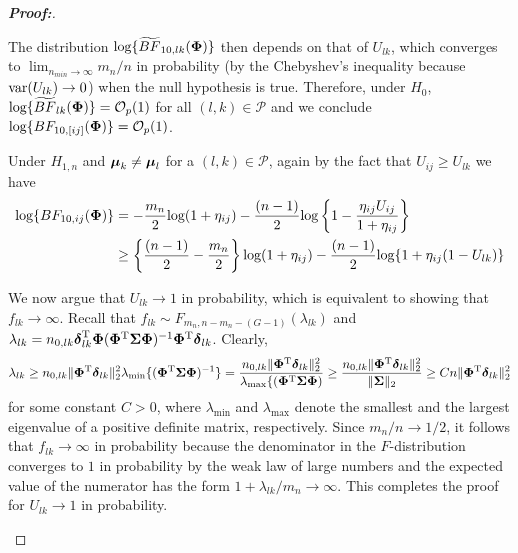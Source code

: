 \documentclass[times,sort&compress,3p]{elsarticle}
\theoremstyle{plain}%
\theoremstyle{definition}
\def\log{\hbox{log}}
\def\var{\hbox{var}}
\def\log{\hbox{log}}
\def\var{\hbox{var}}
\def\be{\begin{eqnarray}}
\def\ee{\end{eqnarray}}
\def\trans{^{\rm T}}
\newcommand{\bSigma}{\mbox{\boldmath $\Sigma$}}
\newcommand{\udelta}            {\mbox{\boldmath$\delta$}}
\newcommand{\umu}               {\mbox{\boldmath$\mu$}}
\newcommand{\uPhi}              {\mbox{\boldmath$\Phi$}}
\begin{document}
\begin{proof}[\textbf{\upshape Proof:}]
\begin{description}
The distribution $ \log\{\widetilde{BF}_{10, lk}(\uPhi) \}$ then depends on that of $U_{lk}$, which
converges to $\lim_{n_{min}\to\infty}m_n/n$ in probability (by the Chebyshev's inequality because $\var(U_{lk})\to 0$)
when the null hypothesis is true.
Therefore, under $H_0$, $\log\{\widetilde{BF}_{lk}(\uPhi) \} = \mathcal{O}_{p}(1)$ for all $(l, k)\in\mathcal{P}$ and we conclude $\log\{BF_{10,[ij]}(\uPhi) \} = \mathcal{O}_{p}(1)$.

Under $H_{1,n}$ and $\umu_{k} \neq \umu_{l}$ for a $(l, k) \in \mathcal{P}$, again 
by the fact that $U_{ij}\geq U_{lk}$ 
we have
\begin{align*}
    \log\{BF_{10,ij}(\uPhi) \} &= -\frac{m_n}{2}\log(1 + \eta_{ij}) - \frac{(n-1)}{2}\log\left\{ 1 - \frac{\eta_{ij} U_{ij}}{1 + \eta_{ij}} \right\}\\
    & \geq \left\{\frac{(n - 1)}{2} - \frac{m_n}{2}\right\}\log(1 + \eta_{ij}) - \frac{(n - 1)}{2}\log\{1 + \eta_{ij}(1 - U_{lk})\}
\end{align*}
{\color{black}
We now argue that $U_{lk}\to 1$ in probability, which is equivalent to showing that $f_{lk}\to\infty$. Recall that $f_{lk}\sim F_{m_n, n - m_n - (G - 1)}(\lambda_{lk})$ and $\lambda_{lk} = n_{0,lk}\udelta_{lk}\trans\mathbf{\Phi}(\mathbf{\Phi}\trans\bSigma\mathbf{\Phi})^{-1}\mathbf{\Phi}\trans\udelta_{lk}$. Clearly,
\[
\lambda_{lk} \geq n_{0,lk}\|\mathbf{\Phi}\trans\udelta_{lk}\|_2^2\lambda_{\min}\{(\mathbf{\Phi}\trans\bSigma\mathbf{\Phi})^{-1}\}
= \frac{n_{0,lk}\|\mathbf{\Phi}\trans\udelta_{lk}\|_2^2}{\lambda_{\max}\{(\mathbf{\Phi}\trans\bSigma\mathbf{\Phi})}\geq \frac{n_{0,lk}\|\mathbf{\Phi}\trans\udelta_{lk}\|_2^2}{\|\bSigma\|_2} \geq Cn\|\mathbf{\Phi}\trans\udelta_{lk}\|_2^2 
\]
for some constant $C > 0$, where $\lambda_{\min}$ and $\lambda_{\max}$ denote the smallest and the largest eigenvalue of a positive definite matrix, respectively. 
Since $m_n/n\to 1/2$, it follows that $f_{lk}\to \infty$ in probability because the denominator in the $F$-distribution converges to $1$ in probability by the weak law of large numbers and the expected value of the numerator has the form $1 + \lambda_{lk}/m_n\to\infty$. This completes the proof for $U_{lk}\to 1$ in probability. 

}
\end{description}
\end{proof}
\end{document}
